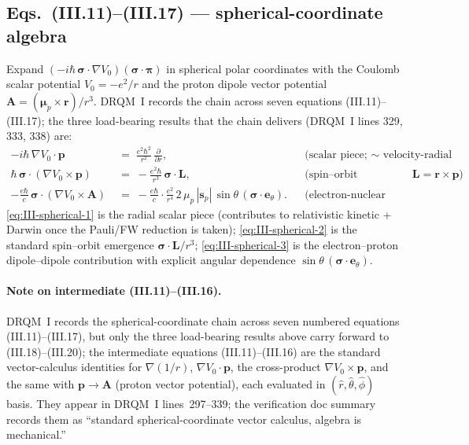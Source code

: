 \subsection{Eqs.~(III.11)--(III.17) --- spherical-coordinate algebra}

Expand $(-i\hbar\,\boldsymbol\sigma\!\cdot\!\nabla V_0)(\boldsymbol\sigma\!\cdot\!\boldsymbol\pi)$
in spherical polar coordinates with the Coulomb scalar potential
$V_0 = -e^2/r$ and the proton dipole vector potential
$\mathbf{A} = (\boldsymbol\mu_p \times \mathbf{r})/r^3$. DRQM~I records the
chain across seven equations (III.11)--(III.17); the three load-bearing
results that the chain delivers (DRQM~I lines 329, 333, 338) are:
\begin{align}
\label{eq:III-spherical-1}
-i\hbar\,\nabla V_0\!\cdot\!\mathbf{p}
\;&=\; \frac{e^2 \hbar^2}{r^2}\,\frac{\partial}{\partial r},
&& \text{(scalar piece; $\sim$ velocity-radial coupling)} \\[2pt]
\label{eq:III-spherical-2}
\hbar\,\boldsymbol\sigma\!\cdot\!(\nabla V_0 \times \mathbf{p})
\;&=\; -\frac{e^2 \hbar}{r^3}\,\boldsymbol\sigma\!\cdot\!\mathbf{L},
&& \text{(spin--orbit emergence; }\mathbf{L} = \mathbf{r}\times\mathbf{p}\text{)} \\[2pt]
\label{eq:III-spherical-3}
-\frac{e\hbar}{c}\,\boldsymbol\sigma\!\cdot\!(\nabla V_0 \times \mathbf{A})
\;&=\; -\frac{e\hbar}{c}\cdot\frac{e^2}{r^4}\,
       2\,\mu_p\,|\mathbf{s}_p|\,\sin\theta\,
       (\boldsymbol\sigma\!\cdot\!\mathbf{e}_\theta).
&& \text{(electron-nuclear cross term)}
\end{align}
\eqref{eq:III-spherical-1} is the radial scalar piece (contributes to
relativistic kinetic + Darwin once the Pauli/FW reduction is taken);
\eqref{eq:III-spherical-2} is the standard spin--orbit emergence
$\boldsymbol\sigma\!\cdot\!\mathbf{L}/r^3$;
\eqref{eq:III-spherical-3} is the electron--proton dipole--dipole
contribution with explicit angular dependence
$\sin\theta\,(\boldsymbol\sigma\!\cdot\!\mathbf{e}_\theta)$.

\paragraph{Note on intermediate (III.11)--(III.16).}
DRQM~I records the spherical-coordinate chain across seven numbered
equations (III.11)--(III.17), but only the three load-bearing results
above carry forward to (III.18)--(III.20); the intermediate equations
(III.11)--(III.16) are the standard vector-calculus identities for
$\nabla(1/r)$, $\nabla V_0\!\cdot\!\mathbf{p}$, the cross-product
$\nabla V_0 \times \mathbf{p}$, and the same with $\mathbf{p}\to\mathbf{A}$
(proton vector potential), each evaluated in $(\hat r, \hat\theta, \hat\phi)$
basis. They appear in DRQM~I lines~297--339; the verification doc summary
records them as ``standard spherical-coordinate vector calculus, algebra
is mechanical.''

